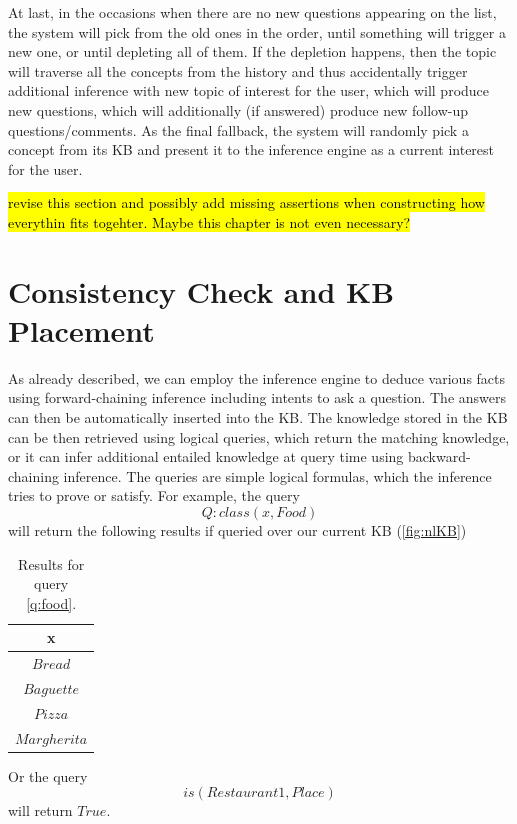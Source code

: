 At last, in the occasions when there are no new questions appearing on the list,
the system will pick from the old ones in the order, until something will 
trigger a new one, or until depleting all of them. If the depletion happens, 
then the topic will traverse all the concepts from the history and thus 
accidentally trigger additional inference with new topic of interest for the 
user, which will produce new questions, which will additionally (if answered) 
produce new follow-up questions/comments. As the final fallback, the system 
will randomly pick a concept from its KB and present it to the inference 
engine as a current interest for the user.

\hl{revise this section and possibly add missing assertions when constructing
how everythin fits togehter. Maybe this chapter is not even necessary?}

\section{Consistency Check and KB Placement}
\label{section:consistency}

As already described, we can employ the inference engine to deduce various 
facts using forward-chaining inference including intents to ask a question. 
The answers can then be automatically inserted into the KB. The knowledge 
stored in the KB can be then retrieved using logical queries, which return 
the matching knowledge, or it can infer additional entailed knowledge at 
query time using backward-chaining inference. The queries are simple logical 
formulas, which the inference tries to prove or satisfy. For example, the
query
\begin{equation}\label{q:food}
	Q:class(x,Food)
\end{equation}
will return the following results if queried over our current KB 
(\autoref{fig:nlKB})

\begin{table}[H]
\centering
\caption{Results for query \ref{q:food}.}
\label{tab:nlResultsFood}
\begin{tabular}{|c|}
	\hline
	\textbf{x} \\
    \hline
    $Bread$ \\
    \hline
    $Baguette$ \\
    \hline 
	$Pizza$ \\
	\hline
	$Margherita$ \\
	\hline
\end{tabular}
\end{table}
Or the query
\begin{equation}
is(Restaurant1,Place)
\end{equation}
will return $True$.

